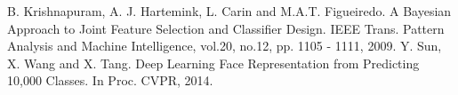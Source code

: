 \begin{thebibliography}{99}
 B. Krishnapuram, A. J. Hartemink, L. Carin and M.A.T. Figueiredo. A Bayesian Approach to Joint Feature Selection and Classifier Design. IEEE Trans. Pattern Analysis and Machine Intelligence, vol.20, no.12, pp. 1105 - 1111, 2009.
 Y. Sun, X. Wang and X. Tang. Deep Learning Face Representation from Predicting 10,000 Classes. In Proc. CVPR, 2014.
\end{thebibliography}
